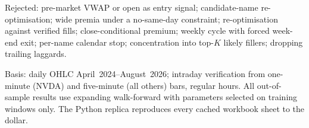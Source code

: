 \documentclass[11pt]{article}
\begin{document}
Rejected: pre-market VWAP or open as entry signal; candidate-name re-optimisation; wide premia
under a no-same-day constraint; re-optimisation against verified fills; close-conditional
premium; weekly cycle with forced week-end exit; per-name calendar stop; concentration into
top-$K$ likely fillers; dropping trailing laggards.

\vfill
{\footnotesize\color{bcgrey} Basis: daily OHLC April~2024--August~2026; intraday verification
from one-minute (NVDA) and five-minute (all others) bars, regular hours. All out-of-sample
results use expanding walk-forward with parameters selected on training windows only. The
Python replica reproduces every cached workbook sheet to the dollar.}
\end{document}
